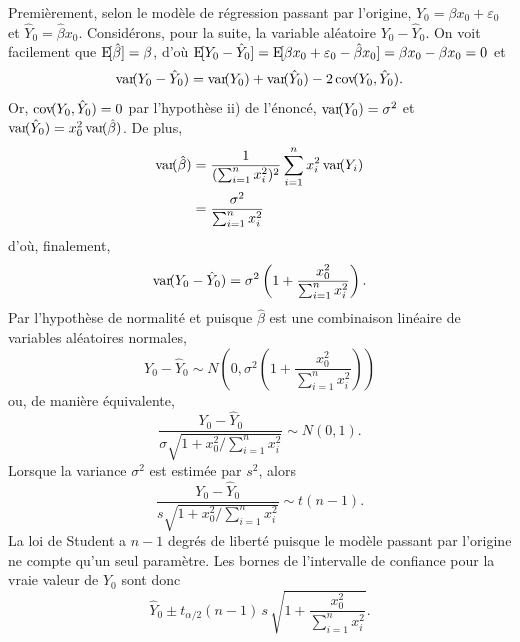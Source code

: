\begin{solution}{2.15}
    Premièrement, selon le modèle de régression passant par l'origine,
    $Y_0 = \beta x_0 + \varepsilon_0$ et $\hat{Y}_0 = \hat{\beta}
    x_0$. Considérons, pour la suite, la variable aléatoire $Y_0 -
    \hat{Y}_0$. On voit facilement que $\mathrm{E}\! [ \hat{\beta} ] = \beta$,
    d'où $\mathrm{E}\! [ Y_0 - \hat{Y}_0 ] = \mathrm{E}\! [ \beta x_0 + \varepsilon_0 -
      \hat{\beta} x_0 ] = \beta x_0 - \beta x_0 = 0$ et
    \begin{displaymath}
      \mathrm{var}\! ( Y_0 - \hat{Y}_0 ) = \mathrm{var}\! ( Y_0 ) + \mathrm{var}\! ( \hat{Y}_0 ) - 2\,
      \mathrm{cov}\! ( Y_0, \hat{Y}_0 ).
    \end{displaymath}
    Or, $\mathrm{cov}\! ( Y_0, \hat{Y}_0 ) = 0$ par l'hypothèse ii) de l'énoncé,
    $\mathrm{var}\! ( Y_0 ) = \sigma^2$ et $\mathrm{var}\! ( \hat{Y}_0 ) = x_0^2\,
    \mathrm{var}\! ( \hat{\beta} )$. De plus,
    \begin{align*}
      \mathrm{var}\! ( \hat{\beta} )
      &= \frac{1}{(\sum_{i=1}^n x_i^2)^2} \sum_{i=1}^n x_i^2\,
      \mathrm{var}\! ( Y_i ) \\
      &= \frac{\sigma^2}{\sum_{i=1}^n x_i^2}
    \end{align*}
    d'où, finalement,
    \begin{displaymath}
      \mathrm{var}\! ( Y_0 - \hat{Y}_0 ) =
      \sigma^2 \left( 1 + \frac{x_0^2}{\sum_{i=1}^n x_i^2} \right).
    \end{displaymath}
    Par l'hypothèse de normalité et puisque $\hat{\beta}$ est une
    combinaison linéaire de variables aléatoires normales,
    \begin{displaymath}
      Y_0 - \hat{Y}_0 \sim N
      \left(
        0, \sigma^2 \left( 1 + \frac{x_0^2}{\sum_{i=1}^n x_i^2} \right)
      \right)
    \end{displaymath}
    ou, de manière équivalente,
    \begin{displaymath}
      \frac{Y_0 - \hat{Y}_0}{\sigma \sqrt{1 + x_0^2/\sum_{i=1}^n x_i^2}}
      \sim N(0, 1).
    \end{displaymath}
    Lorsque la variance $\sigma^2$ est estimée par $s^2$, alors
    \begin{displaymath}
      \frac{Y_0 - \hat{Y}_0}{s \sqrt{1 + x_0^2/\sum_{i=1}^n x_i^2}}
      \sim t(n - 1).
    \end{displaymath}
    La loi de Student a $n - 1$ degrés de liberté puisque le modèle
    passant par l'origine ne compte qu'un seul paramètre. Les bornes
    de l'intervalle de confiance pour la vraie valeur de $Y_0$ sont
    donc
    \begin{displaymath}
      \hat{Y}_0 \pm t_{\alpha/2}(n - 1)\, s\, \sqrt{1 +
        \frac{x_0^2}{\sum_{i=1}^n x_i^2}}.
    \end{displaymath}
  
\end{solution}
